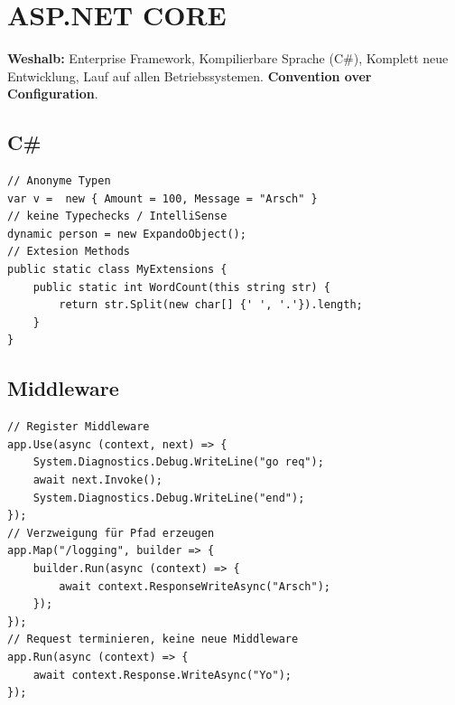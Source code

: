 
\section{ASP.NET CORE}
\textbf{Weshalb:} Enterprise Framework, Kompilierbare Sprache (C\#), Komplett neue Entwicklung, Lauf auf allen Betriebssystemen.
\textbf{Convention over Configuration}.

\subsection{C\#}
\lstset[style=sharpc]
\begin{lstlisting}
// Anonyme Typen
var v =  new { Amount = 100, Message = "Arsch" }
// keine Typechecks / IntelliSense
dynamic person = new ExpandoObject();
// Extesion Methods
public static class MyExtensions {
    public static int WordCount(this string str) {
        return str.Split(new char[] {' ', '.'}).length;
    }
}
\end{lstlisting}

\subsection{Middleware}
\begin{lstlisting}
// Register Middleware
app.Use(async (context, next) => {
    System.Diagnostics.Debug.WriteLine("go req");
    await next.Invoke();
    System.Diagnostics.Debug.WriteLine("end");
});
// Verzweigung für Pfad erzeugen
app.Map("/logging", builder => {
    builder.Run(async (context) => {
        await context.ResponseWriteAsync("Arsch");
    });
});
// Request terminieren, keine neue Middleware
app.Run(async (context) => {
    await context.Response.WriteAsync("Yo");
});
\end{lstlisting}

